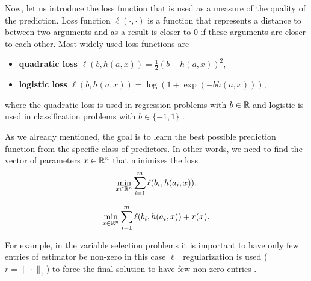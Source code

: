 Now, let us introduce the loss function that is used as a measure of the quality of the prediction. Loss function $\ell(\cdot,\cdot)$ is a function that represents a distance to between two arguments and as a result is closer to $0$ if these arguments are closer to each other. Most widely used loss functions are 
\begin{itemize}
    \item[] {\textbf{quadratic loss}} $\ell(b, h(a,x)) = \frac{1}{2}(b - h(a,x))^2$,
    \item[] {\textbf{logistic loss}} $\ell(b, h(a,x)) = \log(1 + \exp(-bh(a,x))),$
\end{itemize}
where the quadratic loss is used in regression problems with $b\in\mathbb{R}$ \cite{bhattacharya1966estimating} and logistic is used in classification problems with $b\in\{-1,1\}$ \cite{shao2014nonparallel, tang2004granular}.

As we already mentioned, the goal is to learn the best possible prediction function from the specific class of predictors. In other words, we need to find the vector of parameters $x\in\mathbb{R}^n$ that minimizes the  loss 
\begin{equation}\label{eq:erm}
    \min_{x\in\mathbb{R}^n} \sum_{i=1}^m \ell(b_i, h(a_i,x)).
\end{equation}
    

\begin{equation}\label{eq:erm_reg}
\min_{x\in\mathbb{R}^n} \sum_{i=1}^m \ell(b_i, h(a_i,x)) + r(x).
\end{equation}

For example, in the variable selection problems it is important to have only few entries of estimator be non-zero in this case $\ell_1$ regularization is used ($r = \|\cdot\|_1$) to force the final solution to have few non-zero entries \cite{bach2012optimization}.

